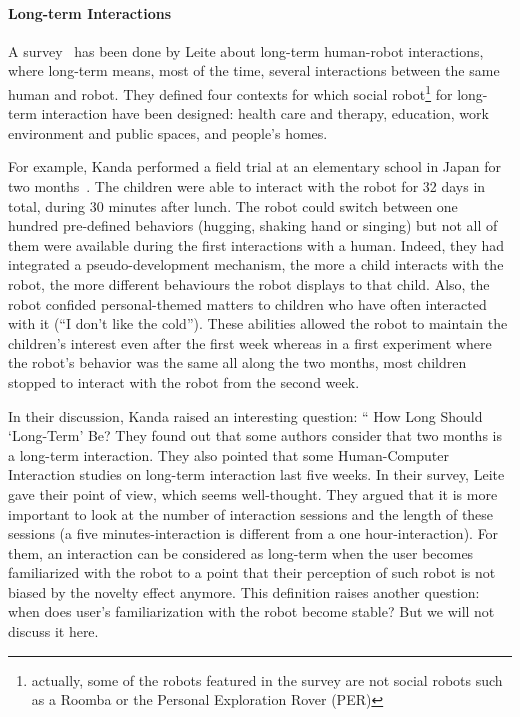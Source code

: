 \documentclass[a4paper,11pt,twoside]{StyleThese}
\begin{document}
\paragraph{Long-term Interactions}
A survey~\cite{leite_2013_social} has been done by Leite \etal{} about long-term human-robot interactions, where long-term means, most of the time, several interactions between the same human and robot. They defined four contexts for which social robot\footnote{actually, some of the robots featured in the survey are not social robots such as a Roomba or the Personal Exploration Rover (PER)} for long-term interaction have been designed: health care and therapy, education, work environment and public spaces, and people's homes. 

For example, Kanda \etal{} performed a field trial at an elementary school in Japan for two months~\cite{kanda_2007_two}. The children were able to interact with the robot for 32 days in total, during 30 minutes after lunch. The robot could switch between one hundred pre-defined behaviors (\eg hugging, shaking hand or singing) but not all of them were available during the first interactions with a human. Indeed, they had integrated a pseudo-development mechanism, \ie the more a child interacts with the robot, the more different behaviours the robot displays to that child. Also, the robot confided personal-themed matters to children who have often interacted with it (\eg ``I don't like the cold''). These abilities allowed the robot to maintain the children's interest even after the first week whereas in a first experiment where the robot's behavior was the same all along the two months, most children stopped to interact with the robot from the second week. 

In their discussion, Kanda \etal{} raised an interesting question: `` How Long Should \textquoteleft Long-Term\textquoteright{} Be? They found out that some authors consider that two months is a long-term interaction. They also pointed that some Human-Computer Interaction studies on long-term interaction last five weeks. In their survey, Leite \etal{} gave their point of view, which seems well-thought. They argued that it is more important to look at the number of interaction sessions and the length of these sessions (a five minutes-interaction is different from a one hour-interaction). For them, an interaction can be considered as long-term when the user becomes familiarized with the robot to a point that their perception of such robot is not biased by the novelty effect anymore. This definition raises another question: when does user’s familiarization with the robot become stable? But we will not discuss it here.
\end{document}
